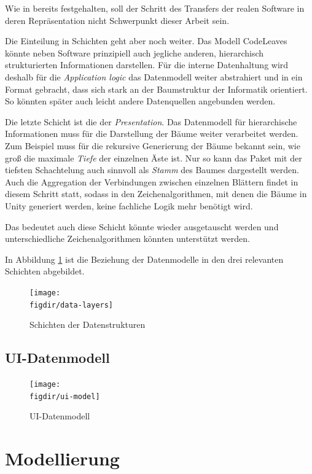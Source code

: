 Wie in  bereits festgehalten, soll der Schritt des Transfers der realen Software in deren Repräsentation nicht Schwerpunkt dieser Arbeit sein.

Die Einteilung in Schichten geht aber noch weiter. Das Modell CodeLeaves könnte neben Software prinzipiell auch jegliche anderen, hierarchisch strukturierten Informationen darstellen. Für die interne Datenhaltung wird deshalb für die \textit{Application logic} das Datenmodell weiter abstrahiert und in ein Format gebracht, dass sich stark an der Baumstruktur der Informatik orientiert. So könnten später auch leicht andere Datenquellen angebunden werden.

Die letzte Schicht ist die der \textit{Presentation}. Das Datenmodell für hierarchische Informationen muss für die Darstellung der Bäume weiter verarbeitet werden. Zum Beispiel muss für die rekursive Generierung der Bäume bekannt sein, wie groß die maximale \textit{Tiefe} der einzelnen Äste ist. Nur so kann das Paket mit der tiefsten Schachtelung auch sinnvoll als \textit{Stamm} des Baumes dargestellt werden. Auch die Aggregation der Verbindungen zwischen einzelnen Blättern findet in diesem Schritt statt, sodass in den Zeichenalgorithmen, mit denen die Bäume in Unity generiert werden, keine fachliche Logik mehr benötigt wird.

Das bedeutet auch diese Schicht könnte wieder ausgetauscht werden und unterschiedliche Zeichenalgorithmen könnten unterstützt werden.

In Abbildung \ref{fig:data-layers} ist die Beziehung der Datenmodelle in den drei relevanten Schichten abgebildet.

\begin{figure}[htb]
  \texttt{[image: \\figdir/data-layers]}
  \caption{Schichten der Datenstrukturen}
  \label{fig:data-layers}
\end{figure}

\section{UI-Datenmodell}
\label{sec:ui-model}

\begin{figure}[htb]
  \texttt{[image: \\figdir/ui-model]}
  \caption{UI-Datenmodell}
  \label{fig:ui-model}
\end{figure}

\chapter{Modellierung}
\label{ch:modelling}

